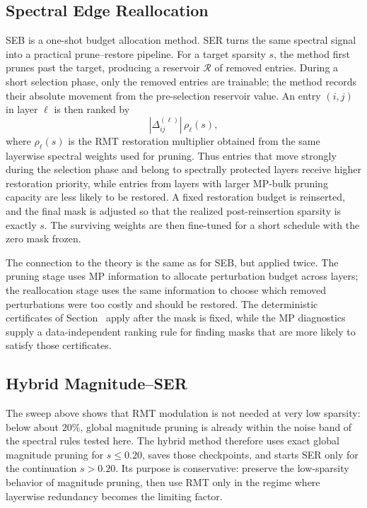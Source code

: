 \documentclass[11pt]{article}
\makeatletter
\theoremstyle{plain}
\theoremstyle{definition}
\theoremstyle{remark}
\newcommand{\1}{\mathbf{1}}
\newcommand{\mainref}[1]{\@ifundefined{r@main-#1}{\@ifundefined{r@#1}{\ref*{orone-#1}}{\ref{#1}}}{\ref*{main-#1}}}
\makeatother
\begin{document}
\subsection{Spectral Edge Reallocation}
\label{subsec:ser_method}

SEB is a one-shot budget allocation method.  SER turns the same spectral signal into a practical prune--restore pipeline.  For a target sparsity \(s\), the method first prunes past the target, producing a reservoir \(\mathcal{R}\) of removed entries.  During a short selection phase, only the removed entries are trainable; the method records their absolute movement from the pre-selection reservoir value.  An entry \((i,j)\) in layer \(\ell\) is then ranked by
\[
|\Delta_{ij}^{(\ell)}|\,\rho_\ell(s),
\]
where \(\rho_\ell(s)\) is the RMT restoration multiplier obtained from the same layerwise spectral weights used for pruning.  Thus entries that move strongly during the selection phase and belong to spectrally protected layers receive higher restoration priority, while entries from layers with larger MP-bulk pruning capacity are less likely to be restored.  A fixed restoration budget is reinserted, and the final mask is adjusted so that the realized post-reinsertion sparsity is exactly \(s\).  The surviving weights are then fine-tuned for a short schedule with the zero mask frozen.

The connection to the theory is the same as for SEB, but applied twice.  The pruning stage uses MP information to allocate perturbation budget across layers; the reallocation stage uses the same information to choose which removed perturbations were too costly and should be restored.  The deterministic certificates of Section~\mainref{Main_theory_gen} apply after the mask is fixed, while the MP diagnostics supply a data-independent ranking rule for finding masks that are more likely to satisfy those certificates.

\subsection{Hybrid Magnitude--SER}
\label{subsec:hybrid_ser_method}

The sweep above shows that RMT modulation is not needed at very low sparsity: below about \(20\%\), global magnitude pruning is already within the noise band of the spectral rules tested here.  The hybrid method therefore uses exact global magnitude pruning for \(s\le0.20\), saves those checkpoints, and starts SER only for the continuation \(s>0.20\).  Its purpose is conservative: preserve the low-sparsity behavior of magnitude pruning, then use RMT only in the regime where layerwise redundancy becomes the limiting factor.
\end{document}

